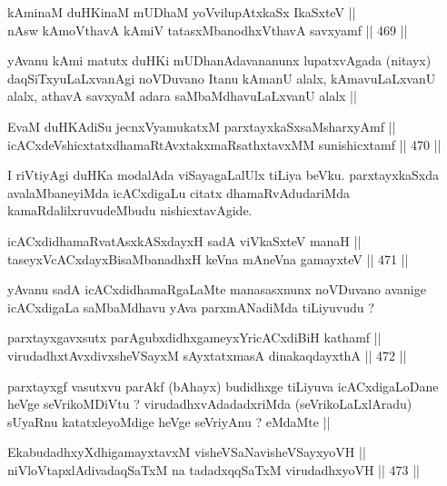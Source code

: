 \begin{shl}
kAminaM duHKinaM mUDhaM yoV\s vilupAtxkaSx IkaSxteV || \\
nAsw kAmoV\s thavA kAmiV tatasxMbanodhxV\s thavA savxyamf ||  469 ||  
\end{shl}

\begin{artha}
yAvanu kAmi matutx duHKi mUDhanAdavananunx lupatxvAgada (nitayx)
daqSiTxyuLaLxvanAgi noVDuvano Itanu kAmanU alalx, kAmavuLaLxvanU
alalx, athavA savxyaM adara saMbaMdhavuLaLxvanU alalx ||
\end{artha}

\begin{shl}
EvaM duHKAdiSu jecnxVyamukatxM parxtayxkaSxsaMsharxyAmf || \\
icACxdeVshicxtatxdhamaRtAvxtakxmaRsathxtavxMM sunishicxtamf ||  470 ||  
\end{shl}

\begin{artha}
I riVtiyAgi duHKa modalAda viSayagaLalUlx tiLiya beVku. parxtayxkaSxda
avalaMbaneyiMda icACxdigaLu citatx dhamaRvAdudariMda
kamaRdalilxruvudeMbudu nishicxtavAgide.
\end{artha}

\begin{shl}
icACxdidhamaRvatAsxkASxdayxH sadA viVkaSxteV manaH || \\
taseyxVcACxdayxBisaMbanadhxH keVna mAneVna gamayxteV ||  471 ||  
\end{shl}

\begin{artha}
yAvanu sadA icACxdidhamaRgaLaMte manasasxnunx noVDuvano avanige
icACxdigaLa saMbaMdhavu yAva parxmANadiMda tiLiyuvudu ?
\end{artha}

\begin{shl}
parxtayxgavxsutx parAgubxdidhxgameyxYricACxdiBiH kathamf || \\
virudadhxtAvxdivxsheVSayxM sAyxtatxmasA dinakaqdayxthA ||  472 ||  
\end{shl}

\begin{artha}
parxtayxgf vasutxvu parAkf (bAhayx) budidhxge tiLiyuva icACxdigaLoDane
heVge seVrikoMDiVtu ? virudadhxvAdadadxriMda (seVrikoLaLxlAradu)
sUyaRnu katatxleyoMdige heVge seVriyAnu ? eMdaMte ||
\end{artha}

\begin{shl}
EkabudadhxyXdhigamayxtavxM visheVSaNavisheVSayxyoVH || \\
niVloVtapxlAdivadaqSaTxM na tadadxqqSaTxM virudadhxyoVH ||  473 ||  
\end{shl}


